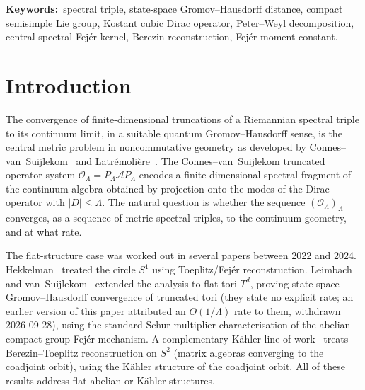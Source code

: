 \documentclass[11pt,a4paper]{article}
\theoremstyle{plain}
\theoremstyle{definition}
\newcommand{\Lammax}{\Lambda}
\newcommand{\Op}{\mathcal{O}}
\newcommand{\Acal}{\mathcal{A}}
\begin{document}
\medskip\noindent
\textbf{Keywords:}\ spectral triple, state-space Gromov--Hausdorff
distance, compact semisimple Lie group, Kostant cubic Dirac operator, Peter--Weyl
decomposition, central spectral Fej\'er kernel, Berezin reconstruction,
Fej\'er-moment constant.

\section{Introduction}\label{sec:intro}

The convergence of finite-dimensional truncations of a Riemannian
spectral triple to its continuum limit, in a suitable quantum
Gromov--Hausdorff sense, is the central metric problem in
noncommutative geometry as developed by
Connes--van~Suijlekom~\cite{connes_vs2021} and
Latr\'emoli\`ere~\cite{latremoliere_metric_st_2017}. The
Connes--van~Suijlekom truncated operator system
$\Op_\Lammax = P_\Lammax \Acal P_\Lammax$ encodes a finite-dimensional
spectral fragment of the continuum algebra obtained by projection onto
the modes of the Dirac operator with $|D| \le \Lammax$. The natural
question is whether the sequence $(\Op_\Lammax)_\Lammax$ converges, as
a sequence of metric spectral triples, to the continuum geometry, and
at what rate.

The flat-structure case was worked out in several papers between 2022
and 2024. Hekkelman~\cite{hekkelman2022} treated the circle $S^1$ using
Toeplitz/Fej\'er reconstruction. Leimbach and
van~Suijlekom~\cite{leimbach_vs2024} extended the analysis to flat
tori $T^d$, proving
state-space Gromov--Hausdorff convergence of truncated tori (they
state no explicit rate; an earlier version of this paper attributed
an $O(1/\Lammax)$ rate to them, withdrawn 2026-09-28), using the
standard Schur multiplier
characterisation of the abelian-compact-group Fej\'er mechanism. A
complementary K\"ahler line of
work~\cite{rieffel2023, hawkins2000} treats Berezin--Toeplitz
reconstruction on $S^2$ (matrix algebras converging to the coadjoint
orbit), using the K\"ahler structure of the coadjoint orbit. All of these results address flat abelian or K\"ahler
structures.
\end{document}
